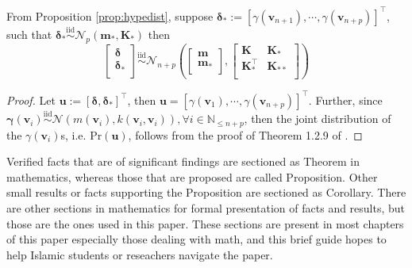 \begin{prop}\label{prop:jointpdf-1}
    From Proposition \ref{prop:hypedist}, suppose $\boldsymbol{\delta}_{*}:=[\gamma(\mathbf{v}_{n+1}),\cdots,\gamma(\mathbf{v}_{n+p})]^{\top}$, such that $\boldsymbol{\delta}_{*}\overset{\mathrm{iid}}{\sim}\mathcal{N}_p(\mathbf{m}_*,\mathbf{K}_*)$ then 
    \begin{equation}
        \left[
        \begin{matrix}
            \boldsymbol{\delta}\\
            \boldsymbol{\delta}_{*}\\
        \end{matrix}
        \right]\overset{\mathrm{iid}}{\sim}
        \mathcal{N}_{n+p}\left(\left[
        \begin{matrix}
            \mathbf{m}\\
            \mathbf{m}_{*}\\
        \end{matrix}
        \right],\left[
        \begin{matrix}
            \mathbf{K}&\mathbf{K}_{*}\\
            \mathbf{K}_{*}^{\top}&\mathbf{K}_{**}\\
        \end{matrix}
        \right]\right)
    \end{equation}
\end{prop}
\begin{proof}
    Let $\mathbf{u}:=[\boldsymbol{\delta},\boldsymbol{\delta}_{*}]^{\top}$, then $\mathbf{u}=[\gamma(\mathbf{v}_1),\cdots,\gamma(\mathbf{v}_{n+p})]^{\top}$. Further, since $\mathbf{\gamma}(\mathbf{v}_i)\overset{\mathrm{iid}}{\sim}\mathcal{N}(m(\mathbf{v}_i),k(\mathbf{v}_i,\mathbf{v}_i)),\forall i\in\mathbb{N}_{\leq n+p}$, then the joint distribution of the $\gamma(\mathbf{v}_i)$s, i.e. $\mathrm{Pr}(\mathbf{u})$, follows from the proof of Theorem 1.2.9 of .
\end{proof}
Verified facts that are of significant findings are sectioned as Theorem in mathematics, whereas those that are proposed are called Proposition. Other small results or facts supporting the Proposition are sectioned as Corollary. There are other sections in mathematics for formal presentation of facts and results, but those are the ones used in this paper. These sections are present in most chapters of this paper especially those dealing with math, and this brief guide hopes to help Islamic students or reseachers navigate the paper.